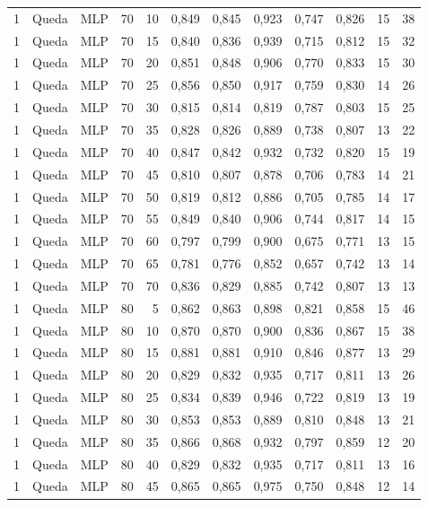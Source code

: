 \begin{longtable}{ccclrrrrrrrr}
1 & Queda & MLP & 70 & 10 & 0,849 & 0,845 & 0,923 & 0,747 & 0,826 & 15 & 38 \\
1 & Queda & MLP & 70 & 15 & 0,840 & 0,836 & 0,939 & 0,715 & 0,812 & 15 & 32 \\
1 & Queda & MLP & 70 & 20 & 0,851 & 0,848 & 0,906 & 0,770 & 0,833 & 15 & 30 \\
1 & Queda & MLP & 70 & 25 & 0,856 & 0,850 & 0,917 & 0,759 & 0,830 & 14 & 26 \\
1 & Queda & MLP & 70 & 30 & 0,815 & 0,814 & 0,819 & 0,787 & 0,803 & 15 & 25 \\
1 & Queda & MLP & 70 & 35 & 0,828 & 0,826 & 0,889 & 0,738 & 0,807 & 13 & 22 \\
1 & Queda & MLP & 70 & 40 & 0,847 & 0,842 & 0,932 & 0,732 & 0,820 & 15 & 19 \\
1 & Queda & MLP & 70 & 45 & 0,810 & 0,807 & 0,878 & 0,706 & 0,783 & 14 & 21 \\
1 & Queda & MLP & 70 & 50 & 0,819 & 0,812 & 0,886 & 0,705 & 0,785 & 14 & 17 \\
1 & Queda & MLP & 70 & 55 & 0,849 & 0,840 & 0,906 & 0,744 & 0,817 & 14 & 15 \\
1 & Queda & MLP & 70 & 60 & 0,797 & 0,799 & 0,900 & 0,675 & 0,771 & 13 & 15 \\
1 & Queda & MLP & 70 & 65 & 0,781 & 0,776 & 0,852 & 0,657 & 0,742 & 13 & 14 \\
1 & Queda & MLP & 70 & 70 & 0,836 & 0,829 & 0,885 & 0,742 & 0,807 & 13 & 13 \\
1 & Queda & MLP & 80 & 5 & 0,862 & 0,863 & 0,898 & 0,821 & 0,858 & 15 & 46 \\
1 & Queda & MLP & 80 & 10 & 0,870 & 0,870 & 0,900 & 0,836 & 0,867 & 15 & 38 \\
1 & Queda & MLP & 80 & 15 & 0,881 & 0,881 & 0,910 & 0,846 & 0,877 & 13 & 29 \\
1 & Queda & MLP & 80 & 20 & 0,829 & 0,832 & 0,935 & 0,717 & 0,811 & 13 & 26 \\
1 & Queda & MLP & 80 & 25 & 0,834 & 0,839 & 0,946 & 0,722 & 0,819 & 13 & 19 \\
1 & Queda & MLP & 80 & 30 & 0,853 & 0,853 & 0,889 & 0,810 & 0,848 & 13 & 21 \\
1 & Queda & MLP & 80 & 35 & 0,866 & 0,868 & 0,932 & 0,797 & 0,859 & 12 & 20 \\
1 & Queda & MLP & 80 & 40 & 0,829 & 0,832 & 0,935 & 0,717 & 0,811 & 13 & 16 \\
1 & Queda & MLP & 80 & 45 & 0,865 & 0,865 & 0,975 & 0,750 & 0,848 & 12 & 14 \\

\end{longtable}
